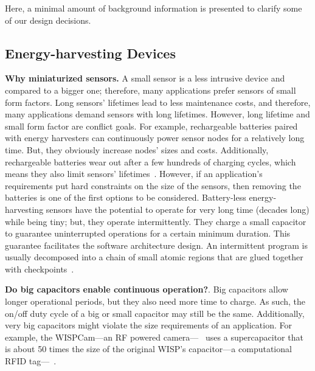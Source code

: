Here, a minimal amount of background information is presented to clarify some of our design decisions. 

\subsection{Energy-harvesting Devices}

\noindent\textbf{ Why miniaturized sensors.} A small sensor is a less intrusive device and compared to a bigger one; therefore, many applications prefer sensors of small form factors.
Long sensors' lifetimes lead to less maintenance costs, and therefore, many applications demand sensors with long lifetimes. However, long lifetime and small form factor are conflict goals.
For example, rechargeable batteries paired with energy harvesters can continuously power sensor nodes for a relatively long time. But, 
they obviously increase nodes' sizes and costs. Additionally, rechargeable batteries wear out after a few hundreds of charging cycles, which means
they also limit sensors' lifetimes~\cite{aditya2008comparison}.  
%
However, if an application's requirements put hard constraints on the size of the sensors, then removing the batteries is one of the first options to be considered. 
Battery-less energy-harvesting sensors have the potential to operate for very long time (decades long) while being tiny; but, they operate intermittently.  
%
They charge a small capacitor to guarantee uninterrupted operations for a certain minimum duration. 
This guarantee facilitates the software architecture design. An intermittent program is usually decomposed  into a chain of small atomic regions that  are  glued together with checkpoints~\cite{ransford2011mementos}. 

%
\noindent\textbf{Do big capacitors enable continuous operation?}. Big capacitors allow longer operational periods, but they also need more time to charge. 
As such, the on/off duty cycle of a big or small capacitor may still be the same. Additionally, very big capacitors might violate
the size requirements of an application. For example, the WISPCam---an RF powered camera---~\cite{naderiparizi2015wispcam} uses a supercapacitor that is about 50 times the size of the original WISP's capacitor---a computational RFID tag---~\cite{smith2006wirelessly}.

